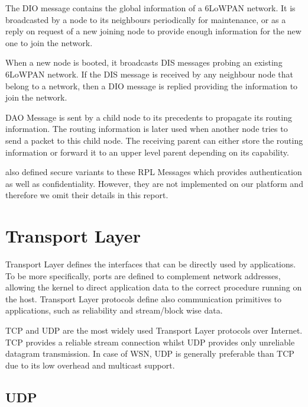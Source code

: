\begin{description}[style=nextline]
	\begin{description}[style=nextline]
		\item[\textbf{DAG Information Object (DIO) Message}]
		The DIO message contains the global information of a 6LoWPAN network. It is broadcasted by a node to its neighbours periodically for maintenance, or as a reply on request of a new joining node to provide enough information for the new one to join the network.
		\item[\textbf{DAG Information Solicitation (DIS) Message}]
		When a new node is booted, it broadcasts DIS messages probing an existing 6LoWPAN network. If the DIS message is received by any neighbour node that belong to a network, then a DIO message is replied providing the information to join the network.
		\item[\textbf{Destination Advertisement Object (DAO) Message}]
		DAO Message is sent by a child node to its precedents to propagate its routing information. The routing information is later used when another node tries to send a packet to this child node. The receiving parent can either store the routing information or forward it to an upper level parent depending on its capability.
	\end{description}
	
	\cite{rfc6550} also defined secure variants to these RPL Messages which provides authentication as well as confidentiality. However, they are not implemented on our platform and therefore we omit their details in this report.
\end{description}

\section{Transport Layer} \label{Sec: Transport Layer}
Transport Layer defines the interfaces that can be directly used by applications. To be more specifically, ports are defined to complement network addresses, allowing the kernel to direct application data to the correct procedure running on the host. Transport Layer protocols define also communication primitives to applications, such as reliability and stream/block wise data.

TCP and UDP are the most widely used Transport Layer protocols over Internet. TCP provides a reliable stream connection whilst UDP provides only unreliable datagram transmission. In case of WSN, UDP is generally preferable than TCP due to its low overhead and multicast support.

\subsection{UDP} \label{Subsec: UDP}

